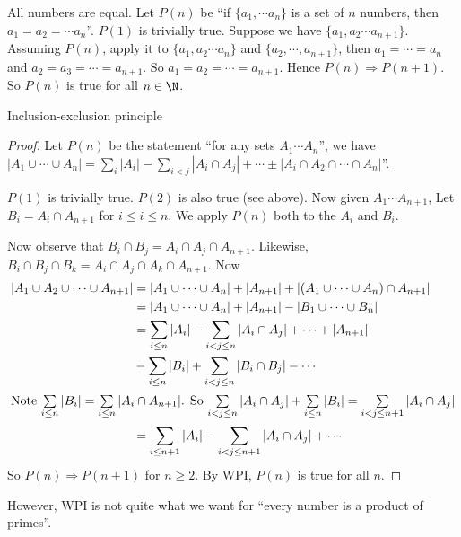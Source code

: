\documentclass[a4paper]{article}
\begin{document}
  \begin{eg}
    All numbers are equal. Let $P(n)$ be ``if $\{a_1, \cdots a_n\}$ is a set of $n$ numbers, then $a_1 = a_2 = \cdots a_n$''. $P(1)$  is trivially true. Suppose we have $\{a_1, a_2\cdots a_{n+1}\}$. Assuming $P(n)$, apply it to $\{a_1, a_2\cdots a_n\}$ and $\{a_2, \cdots , a_{n + 1}\}$, then $a_1 = \cdots = a_n$ and $a_2 = a_3 = \cdots = a_{n + 1}$. So $a_1 = a_2 = \cdots = a_{n + 1}$. Hence $P(n)\Rightarrow P(n + 1)$. So $P(n)$ is true for all $n\in \N$.
  \end{eg}

  \begin{thm}
    Inclusion-exclusion principle
  \end{thm}

  \begin{proof}
    Let $P(n)$ be the statement ``for any sets $A_1\cdots A_n$'', we have $|A_1\cup \cdots \cup A_n| = \sum_i|A_i| - \sum_{i < j} |A_i\cap A_j| + \cdots \pm |A_i\cap A_2\cap \cdots \cap A_n|$''.

    $P(1)$ is trivially true. $P(2)$ is also true (see above). Now given $A_1 \cdots A_{n + 1}$, Let $B_i = A_i\cap A_{n + 1}$  for $i \leq i\leq n$. We apply $P(n)$ both to the $A_i$ and $B_i$.

    Now observe that $B_i\cap B_j = A_i\cap A_j \cap A_{n + 1}$. Likewise, $B_i\cap B_j\cap B_k = A_i\cap A_j\cap A_k\cap A_{n + 1}$. Now
    \begin{align*}
      |A_1\cup A_2\cup \cdots \cup A_{n + 1}| &= |A_1\cup \cdots \cup A_n| + |A_{n + 1}| + |(A_1\cup\cdots\cup A_n)\cap A_{n + 1}|\\
      &= |A_1\cup \cdots \cup A_n| + |A_{n + 1}| - |B_{1}\cup \cdots \cup B_n|\\
      &= \sum_{i\leq n}|A_i| - \sum_{i < j\leq n}|A_i\cap A_j| + \cdots + |A_{n + 1}| \\
      &-\sum_{i \leq n}|B_i| + \sum_{i < j\leq n}|B_i\cap B_j| - \cdots \\
      \intertext{Note $\sum\limits_{i\leq n}|B_i| = \sum\limits_{i\leq n}|A_i\cap A_{n + 1}|$. So $\sum\limits_{i < j\leq n}|A_i\cap A_j| + \sum\limits_{i\leq n}|B_i| = \sum\limits_{i< j \leq n + 1}|A_i \cap A_j|$}
      &= \sum_{i \leq n + 1}|A_i| - \sum_{i< j \leq n + 1}|A_i \cap A_j| + \cdots
    \end{align*}
    So $P(n)\Rightarrow P(n + 1)$ for $n\geq 2$. By WPI, $P(n)$ is true for all $n$.
  \end{proof}

  However, WPI is not quite what we want for ``every number is a product of primes''.
\end{document}
